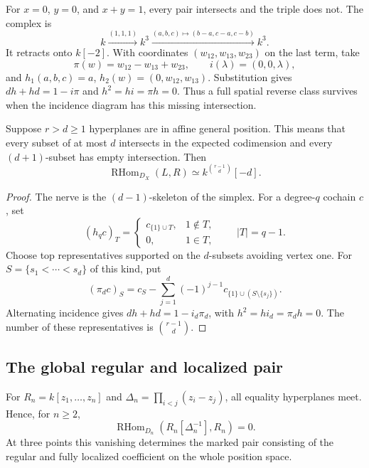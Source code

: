 \begin{example}\label{cbc:ac:affine-triple}
For $x=0$, $y=0$, and $x+y=1$, every pair
intersects and the triple does not. The complex is
\[
 k\xrightarrow{(1,1,1)}k^3
       \xrightarrow{(a,b,c)\mapsto(b-a,c-a,c-b)}k^3.
\]
It retracts onto $k[-2]$. With coordinates
$(w_{12},w_{13},w_{23})$ on the last term, take
\[
 \pi(w)=w_{12}-w_{13}+w_{23},\qquad
 i(\lambda)=(0,0,\lambda),
\]
and
$h_1(a,b,c)=a$, $h_2(w)=(0,w_{12},w_{13})$.
Substitution gives $dh+hd=1-i\pi$ and
$h^2=hi=\pi h=0$. Thus a full spatial reverse
class survives when the incidence diagram has
this missing intersection.
\end{example}

\begin{corollary}\label{cbc:ac:general-position}
Suppose $r>d\geq1$ hyperplanes are in affine
general position. This means that every subset
of at most $d$ intersects in the expected codimension
and every $(d+1)$-subset has empty intersection.
Then
\[
 \operatorname{RHom}_{D_X}(L,R)
                 \simeq k^{\binom{r-1}{d}}[-d].
\]
\end{corollary}
\begin{proof}
The nerve is the $(d-1)$-skeleton of the simplex.
For a degree-$q$ cochain $c$, set
\[
 (h_qc)_T=
 \begin{cases}
  c_{\{1\}\cup T},&1\notin T,\\
  0,&1\in T,
 \end{cases}
 \qquad |T|=q-1.
\]
Choose top representatives supported on the
$d$-subsets avoiding vertex one.
For $S=\{s_1<\cdots<s_d\}$ of this kind, put
\[
 (\pi_dc)_S=c_S-\sum_{j=1}^d(-1)^{j-1}
                       c_{\{1\}\cup(S\setminus\{s_j\})}.
\]
Alternating incidence gives
$dh+hd=1-i_d\pi_d$, with
$h^2=hi_d=\pi_dh=0$.
The number of these representatives is
$\binom{r-1}{d}$.
\end{proof}

\subsection{The global regular and localized pair}

For $R_n=k[z_1,\ldots,z_n]$ and
$\Delta_n=\prod_{i<j}(z_i-z_j)$, all equality
hyperplanes meet. Hence, for $n\geq2$,
\[
 \operatorname{RHom}_{D_n}
                (R_n[\Delta_n^{-1}],R_n)=0.
\]
At three points this vanishing determines the
marked pair consisting of the regular and fully
localized coefficient on the whole position space.

